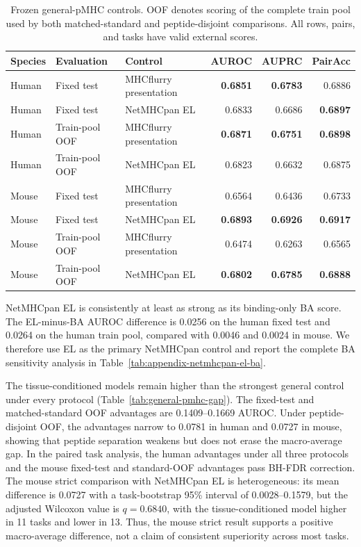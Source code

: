 \begin{table}[tbp]
\centering
\caption{Frozen general-pMHC controls. OOF denotes scoring of the complete train pool used by both matched-standard and peptide-disjoint comparisons. All rows, pairs, and tasks have valid external scores.}
\label{tab:general-pmhc-main}
\footnotesize
\setlength{\tabcolsep}{3pt}
\begin{tabular}{lllrrr}
\toprule
Species & Evaluation & Control & AUROC & AUPRC & PairAcc \\
\midrule
Human & Fixed test & MHCflurry presentation & \textbf{0.6851} & \textbf{0.6783} & 0.6886 \\
Human & Fixed test & NetMHCpan EL & 0.6833 & 0.6686 & \textbf{0.6897} \\
Human & Train-pool OOF & MHCflurry presentation & \textbf{0.6871} & \textbf{0.6751} & \textbf{0.6898} \\
Human & Train-pool OOF & NetMHCpan EL & 0.6823 & 0.6632 & 0.6875 \\
Mouse & Fixed test & MHCflurry presentation & 0.6564 & 0.6436 & 0.6733 \\
Mouse & Fixed test & NetMHCpan EL & \textbf{0.6893} & \textbf{0.6926} & \textbf{0.6917} \\
Mouse & Train-pool OOF & MHCflurry presentation & 0.6474 & 0.6263 & 0.6565 \\
Mouse & Train-pool OOF & NetMHCpan EL & \textbf{0.6802} & \textbf{0.6785} & \textbf{0.6888} \\
\bottomrule
\end{tabular}
\end{table}

NetMHCpan EL is consistently at least as strong as its binding-only BA score. The EL-minus-BA AUROC difference is 0.0256 on the human fixed test and 0.0264 on the human train pool, compared with 0.0046 and 0.0024 in mouse. We therefore use EL as the primary NetMHCpan control and report the complete BA sensitivity analysis in Table~\ref{tab:appendix-netmhcpan-el-ba}.

The tissue-conditioned models remain higher than the strongest general control under every protocol (Table~\ref{tab:general-pmhc-gap}). The fixed-test and matched-standard OOF advantages are 0.1409--0.1669 AUROC. Under peptide-disjoint OOF, the advantages narrow to 0.0781 in human and 0.0727 in mouse, showing that peptide separation weakens but does not erase the macro-average gap. In the paired task analysis, the human advantages under all three protocols and the mouse fixed-test and standard-OOF advantages pass BH-FDR correction. The mouse strict comparison with NetMHCpan EL is heterogeneous: its mean difference is 0.0727 with a task-bootstrap 95\% interval of 0.0028--0.1579, but the adjusted Wilcoxon value is \(q=0.6840\), with the tissue-conditioned model higher in 11 tasks and lower in 13. Thus, the mouse strict result supports a positive macro-average difference, not a claim of consistent superiority across most tasks.

